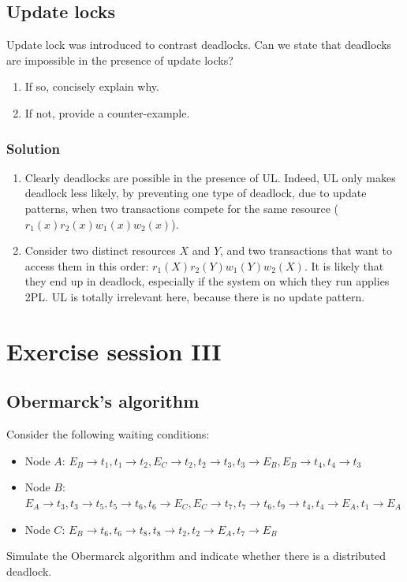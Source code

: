 \documentclass[12pt, a4paper]{report}
\begin{document}
    \newpage

    \section{Update locks}
        Update lock was introduced to contrast deadlocks. Can we state that deadlocks are impossible in the presence of update locks?
        \begin{enumerate}
            \item If so, concisely explain why. 
            \item If not, provide a counter-example.
        \end{enumerate}
    \subsection*{Solution}
        \begin{enumerate}
            \item Clearly deadlocks are possible in the presence of UL. Indeed, UL only makes deadlock less likely, by preventing one type of deadlock, due to 
                update patterns, when two transactions compete for the same resource ($r_1(x) r_2(x) w_1(x) w_2(x)$). 
            \item Consider two distinct resources $X$ and $Y$, and two transactions that want to access them in this order: $r_1(X) r_2(Y) w_1(Y) w_2(X)$. It is likely that they end up 
                in deadlock, especially if the system on which they run applies 2PL. UL is totally irrelevant here, because there is no update pattern. 
        \end{enumerate}

\newpage

\chapter{Exercise session III}
    \section{Obermarck's algorithm}
        Consider the following waiting conditions:
        \begin{itemize}
            \item Node $A$: $E_B \rightarrow t_1, t_1 \rightarrow t_2, E_C \rightarrow t_2, t_2 \rightarrow t_3, t_3 \rightarrow E_B, E_B \rightarrow t_4, t_4 \rightarrow t_3$
            \item Node $B$: $E_A \rightarrow t_3, t_3 \rightarrow t_5, t_5 \rightarrow t_6, t_6 \rightarrow E_C, E_C \rightarrow t_7, t_7 \rightarrow t_6, t_9 \rightarrow t_4,t_4 \rightarrow E_A, t_1 \rightarrow E_A$
            \item Node $C$: $E_B \rightarrow t_6, t_6 \rightarrow t_8, t_8 \rightarrow t_2, t_2 \rightarrow E_A, t_7 \rightarrow E_B$
        \end{itemize}
        Simulate the Obermarck algorithm and indicate whether there is a distributed deadlock.
\end{document}

